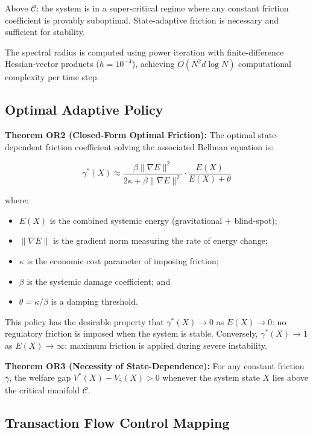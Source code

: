 \documentclass[12pt,a4paper]{article}
\begin{document}
Above $\mathcal{C}$: the system is in a super-critical regime where any 
constant friction coefficient is provably suboptimal. State-adaptive 
friction is necessary and sufficient for stability.

The spectral radius is computed using power iteration with finite-difference 
Hessian-vector products ($h = 10^{-4}$), achieving $O(N^2 d \log N)$ 
computational complexity per time step.

\subsection{Optimal Adaptive Policy}

\textbf{Theorem OR2 (Closed-Form Optimal Friction):} The optimal 
state-dependent friction coefficient solving the associated Bellman equation 
is:

\begin{equation}
\gamma^*(X) \approx \frac{\beta\|\nabla E\|^2}{2\kappa + 
\beta\|\nabla E\|^2} \cdot \frac{E(X)}{E(X) + \theta}
\end{equation}

where:
\begin{itemize}
\item $E(X)$ is the combined systemic energy (gravitational + blind-spot);
\item $\|\nabla E\|$ is the gradient norm measuring the rate of energy 
change;
\item $\kappa$ is the economic cost parameter of imposing friction;
\item $\beta$ is the systemic damage coefficient; and
\item $\theta = \kappa/\beta$ is a damping threshold.
\end{itemize}

This policy has the desirable property that $\gamma^*(X) \to 0$ as 
$E(X) \to 0$: no regulatory friction is imposed when the system is stable. 
Conversely, $\gamma^*(X) \to 1$ as $E(X) \to \infty$: maximum friction is 
applied during severe instability.

\textbf{Theorem OR3 (Necessity of State-Dependence):} For any constant 
friction $\bar{\gamma}$, the welfare gap $V^*(X) - V_{\bar{\gamma}}(X) > 0$ 
whenever the system state $X$ lies above the critical manifold 
$\mathcal{C}$.

\subsection{Transaction Flow Control Mapping}
\end{document}
